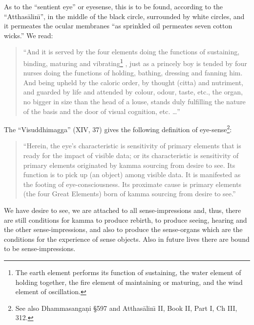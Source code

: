 \documentclass{book}
\begin{document}
As to the ``sentient eye'' or eyesense, this is to be found, according
to the ``Atthas{\=a}lin\=\i'', in the middle of the black circle,
surrounded by white circles, and it permeates the ocular membranes ``as
sprinkled oil permeates seven cotton wicks.'' We read:




\begin{quote}\begin{flushleft}
``And it is served by the four elements doing the functions of
sustaining, binding, maturing and vibrating\footnote{The earth
element performs its function of sustaining, the water element of
holding together, the fire element of maintaining or maturing, and the
wind element of oscillation.} , just as a princely boy is tended by
four nurses doing the functions of holding, bathing, dressing and
fanning him. And being upheld by the caloric order, by thought (citta)
and nutriment, and guarded by life and attended by colour, odour,
taste, etc., the organ, no bigger in size than the head of a louse,
stands duly fulfilling the nature of the basis and the door of visual
cognition, etc. \ldots''
\end{flushleft}\end{quote}




The ``Visuddhimagga'' (XIV, 37) gives the following definition of
eye-sense\footnote{See also Dhamma\-sanga\d ni {\S}597 and
Atthas{\=a}lin\=\i{}  II, Book II, Part I, Ch III, 312.}:




\begin{quote}\begin{flushleft}
``Herein, the eye's characteristic is sensitivity of primary elements
that is ready for the impact of visible data; or its characteristic is
sensitivity of primary elements originated by kamma sourcing from
desire to see. Its function is to pick up (an object) among visible
data. It is manifested as the footing of eye-consciousness. Its
proximate cause is primary elements (the four Great Elements) born of
kamma sourcing from desire to see.''
\end{flushleft}\end{quote}




We have desire to see, we are attached to all sense-impress\-ions and,
thus, there are still conditions for kamma to produce rebirth, to
produce seeing, hearing and the other sense-impres\-sions, and also to
produce the sense-organs which are the conditions for the experience
of sense objects. Also in future lives there are bound to be
sense-impressions. 
\end{document}
